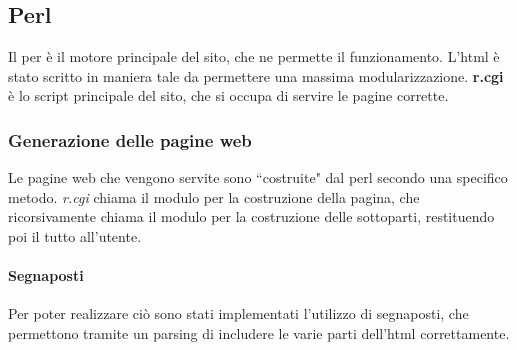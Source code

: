 \subsection{Perl}
Il per \`e il motore principale del sito, che ne permette il funzionamento. L'html \`e stato scritto in maniera tale da permettere una massima modularizzazione. \textbf{r.cgi} \`e lo script principale del sito, che si occupa di servire le pagine corrette.
\subsubsection{Generazione delle pagine web}
Le pagine web che vengono servite sono ``costruite" dal perl secondo una specifico metodo. \textit{r.cgi} chiama il modulo per la costruzione della pagina, che ricorsivamente chiama il modulo per la costruzione delle sottoparti, restituendo poi il tutto all'utente.
\paragraph*{Segnaposti} Per poter realizzare ci\`o sono stati implementati l'utilizzo di segnaposti, che permettono tramite un parsing di includere le varie parti dell'html correttamente.

